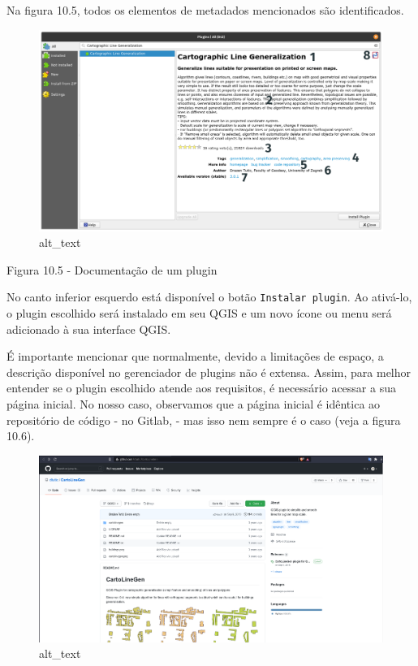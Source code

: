 \documentclass[
  portuguese,
]{krantz}
\begin{document}
Na figura 10.5, todos os elementos de metadados mencionados são identificados.

\begin{figure}
\centering
\includegraphics{media/modulo10/fig105.png}
\caption{alt\_text}
\end{figure}

Figura 10.5 - Documentação de um plugin

No canto inferior esquerdo está disponível o botão \texttt{Instalar\ plugin}. Ao ativá-lo, o plugin escolhido será instalado em seu QGIS e um novo ícone ou menu será adicionado à sua interface QGIS.

É importante mencionar que normalmente, devido a limitações de espaço, a descrição disponível no gerenciador de plugins não é extensa. Assim, para melhor entender se o plugin escolhido atende aos requisitos, é necessário acessar a sua página inicial. No nosso caso, observamos que a página inicial é idêntica ao repositório de código - no Gitlab, - mas isso nem sempre é o caso (veja a figura 10.6).

\begin{figure}
\centering
\includegraphics{media/modulo10/fig106_a.png}
\caption{alt\_text}
\end{figure}
\end{document}
